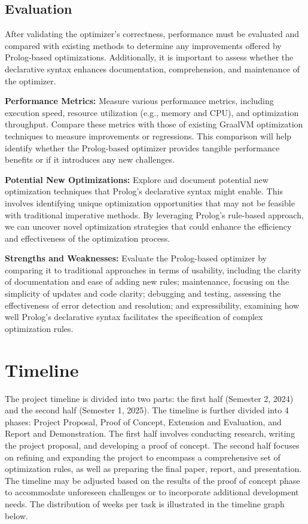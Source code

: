 \subsection{Evaluation}
After validating the optimizer's correctness, performance must be evaluated and compared with existing methods to determine any improvements offered by Prolog-based optimizations. Additionally, it is important to assess whether the declarative syntax enhances documentation, comprehension, and maintenance of the optimizer.
\begin{description}
    \item \textbf{Performance Metrics:} Measure various performance metrics, including execution speed, resource utilization (e.g., memory and CPU), and optimization throughput. Compare these metrics with those of existing GraalVM optimization techniques to measure improvements or regressions. This comparison will help identify whether the Prolog-based optimizer provides tangible performance benefits or if it introduces any new challenges.
    \item \textbf{Potential New Optimizations:} Explore and document potential new optimization techniques that Prolog's declarative syntax might enable. This involves identifying unique optimization opportunities that may not be feasible with traditional imperative methods. By leveraging Prolog’s rule-based approach, we can uncover novel optimization strategies that could enhance the efficiency and effectiveness of the optimization process.
    \item \textbf{Strengths and Weaknesses:} Evaluate the Prolog-based optimizer by comparing it to traditional approaches in terms of usability, including the clarity of documentation and ease of adding new rules; maintenance, focusing on the simplicity of updates and code clarity; debugging and testing, assessing the effectiveness of error detection and resolution; and expressibility, examining how well Prolog's declarative syntax facilitates the specification of complex optimization rules.
\end{description}


\section{Timeline}
The project timeline is divided into two parts: the first half (Semester 2, 2024) and the second half (Semester 1, 2025). The timeline is further divided into 4 phases: Project Proposal, Proof of Concept, Extension and Evaluation, and Report and Demonstration. The first half involves conducting research, writing the project proposal, and developing a proof of concept. The second half focuses on refining and expanding the project to encompass a comprehensive set of optimization rules, as well as preparing the final paper, report, and presentation. The timeline may be adjusted based on the results of the proof of concept phase to accommodate unforeseen challenges or to incorporate additional development needs.  The distribution of weeks per task is illustrated in the timeline graph below.

